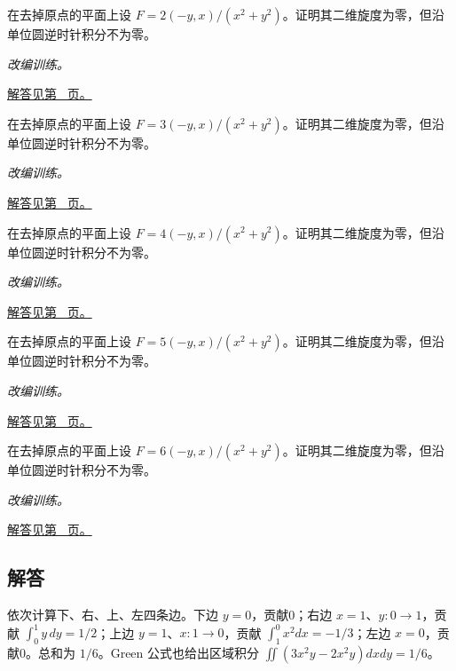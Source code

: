 \documentclass[UTF8,12pt,a4paper,fontset=fandol]{ctexart}
\begin{document}
\begin{example}[有孔区域与无旋场]\label{ex:c41q21}
在去掉原点的平面上设 $F=2(-y,x)/(x^2+y^2)$。证明其二维旋度为零，但沿单位圆逆时针积分不为零。
\par\textit{改编训练。}\par\hyperref[ans:c41q21]{解答见第~\pageref{ans:c41q21} 页。}
\end{example}
\begin{example}[有孔区域与无旋场]\label{ex:c41q22}
在去掉原点的平面上设 $F=3(-y,x)/(x^2+y^2)$。证明其二维旋度为零，但沿单位圆逆时针积分不为零。
\par\textit{改编训练。}\par\hyperref[ans:c41q22]{解答见第~\pageref{ans:c41q22} 页。}
\end{example}
\begin{example}[有孔区域与无旋场]\label{ex:c41q23}
在去掉原点的平面上设 $F=4(-y,x)/(x^2+y^2)$。证明其二维旋度为零，但沿单位圆逆时针积分不为零。
\par\textit{改编训练。}\par\hyperref[ans:c41q23]{解答见第~\pageref{ans:c41q23} 页。}
\end{example}
\begin{example}[有孔区域与无旋场]\label{ex:c41q24}
在去掉原点的平面上设 $F=5(-y,x)/(x^2+y^2)$。证明其二维旋度为零，但沿单位圆逆时针积分不为零。
\par\textit{改编训练。}\par\hyperref[ans:c41q24]{解答见第~\pageref{ans:c41q24} 页。}
\end{example}
\begin{example}[有孔区域与无旋场]\label{ex:c41q25}
在去掉原点的平面上设 $F=6(-y,x)/(x^2+y^2)$。证明其二维旋度为零，但沿单位圆逆时针积分不为零。
\par\textit{改编训练。}\par\hyperref[ans:c41q25]{解答见第~\pageref{ans:c41q25} 页。}
\end{example}
\subsection{解答}
\begin{solve}\label{ans:c41q1}
依次计算下、右、上、左四条边。下边 $y=0$，贡献0；右边 $x=1$、$y:0\to1$，贡献 $\int_0^1y\,dy=1/2$；上边 $y=1$、$x:1\to0$，贡献 $\int_1^0x^2dx=-1/3$；左边 $x=0$，贡献0。总和为 $1/6$。Green 公式也给出区域积分 $\iint(3x^2y-2x^2y)dxdy=1/6$。
\end{solve}
\end{document}
